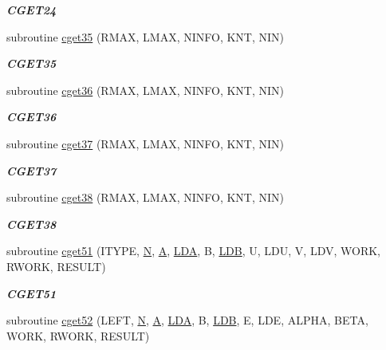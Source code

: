 \begin{DoxyCompactItemize}
\begin{DoxyCompactList}\small\item\em {\bfseries C\+G\+E\+T24} \end{DoxyCompactList}\item 
subroutine \hyperlink{group__complex__eig_ga749fac66036c4311ca3a1fc5f29bc4ad}{cget35} (R\+M\+A\+X, L\+M\+A\+X, N\+I\+N\+F\+O, K\+N\+T, N\+I\+N)
\begin{DoxyCompactList}\small\item\em {\bfseries C\+G\+E\+T35} \end{DoxyCompactList}\item 
subroutine \hyperlink{group__complex__eig_gaf911ed8696d5b150c4d44077b2132b34}{cget36} (R\+M\+A\+X, L\+M\+A\+X, N\+I\+N\+F\+O, K\+N\+T, N\+I\+N)
\begin{DoxyCompactList}\small\item\em {\bfseries C\+G\+E\+T36} \end{DoxyCompactList}\item 
subroutine \hyperlink{group__complex__eig_ga70075f042e15dc8f5bc26c15d38759ca}{cget37} (R\+M\+A\+X, L\+M\+A\+X, N\+I\+N\+F\+O, K\+N\+T, N\+I\+N)
\begin{DoxyCompactList}\small\item\em {\bfseries C\+G\+E\+T37} \end{DoxyCompactList}\item 
subroutine \hyperlink{group__complex__eig_ga31605f4f439bba3ee9ce9c1c24df2e7c}{cget38} (R\+M\+A\+X, L\+M\+A\+X, N\+I\+N\+F\+O, K\+N\+T, N\+I\+N)
\begin{DoxyCompactList}\small\item\em {\bfseries C\+G\+E\+T38} \end{DoxyCompactList}\item 
subroutine \hyperlink{group__complex__eig_gab476cc3251f71c95e0a4a42bcd6d7885}{cget51} (I\+T\+Y\+P\+E, \hyperlink{polmisc_8c_a0240ac851181b84ac374872dc5434ee4}{N}, \hyperlink{classA}{A}, \hyperlink{example__user_8c_ae946da542ce0db94dced19b2ecefd1aa}{L\+D\+A}, B, \hyperlink{example__user_8c_a50e90a7104df172b5a89a06c47fcca04}{L\+D\+B}, U, L\+D\+U, V, L\+D\+V, W\+O\+R\+K, R\+W\+O\+R\+K, R\+E\+S\+U\+L\+T)
\begin{DoxyCompactList}\small\item\em {\bfseries C\+G\+E\+T51} \end{DoxyCompactList}\item 
subroutine \hyperlink{group__complex__eig_gaad38988d8cb0400e6a532510a3819e1b}{cget52} (L\+E\+F\+T, \hyperlink{polmisc_8c_a0240ac851181b84ac374872dc5434ee4}{N}, \hyperlink{classA}{A}, \hyperlink{example__user_8c_ae946da542ce0db94dced19b2ecefd1aa}{L\+D\+A}, B, \hyperlink{example__user_8c_a50e90a7104df172b5a89a06c47fcca04}{L\+D\+B}, E, L\+D\+E, A\+L\+P\+H\+A, B\+E\+T\+A, W\+O\+R\+K, R\+W\+O\+R\+K, R\+E\+S\+U\+L\+T)

\end{DoxyCompactItemize}
